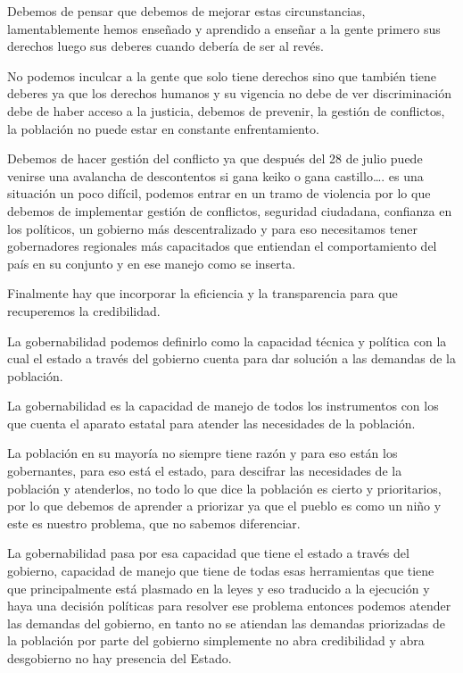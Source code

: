 \documentclass[
  letterpaper,
  DIV=11,
  numbers=noendperiod]{scrartcl}
\begin{document}
Debemos de pensar que debemos de mejorar estas circunstancias,
lamentablemente hemos enseñado y aprendido a enseñar a la gente primero
sus derechos luego sus deberes cuando debería de ser al revés.

No podemos inculcar a la gente que solo tiene derechos sino que también
tiene deberes ya que los derechos humanos y su vigencia no debe de ver
discriminación debe de haber acceso a la justicia, debemos de prevenir,
la gestión de conflictos, la población no puede estar en constante
enfrentamiento.

Debemos de hacer gestión del conflicto ya que después del 28 de julio
puede venirse una avalancha de descontentos si gana keiko o gana
castillo\ldots. es una situación un poco difícil, podemos entrar en un
tramo de violencia por lo que debemos de implementar gestión de
conflictos, seguridad ciudadana, confianza en los políticos, un gobierno
más descentralizado y para eso necesitamos tener gobernadores regionales
más capacitados que entiendan el comportamiento del país en su conjunto
y en ese manejo como se inserta.

Finalmente hay que incorporar la eficiencia y la transparencia para que
recuperemos la credibilidad.

La gobernabilidad podemos definirlo como la capacidad técnica y política
con la cual el estado a través del gobierno cuenta para dar solución a
las demandas de la población.

La gobernabilidad es la capacidad de manejo de todos los instrumentos
con los que cuenta el aparato estatal para atender las necesidades de la
población.

La población en su mayoría no siempre tiene razón y para eso están los
gobernantes, para eso está el estado, para descifrar las necesidades de
la población y atenderlos, no todo lo que dice la población es cierto y
prioritarios, por lo que debemos de aprender a priorizar ya que el
pueblo es como un niño y este es nuestro problema, que no sabemos
diferenciar.

La gobernabilidad pasa por esa capacidad que tiene el estado a través
del gobierno, capacidad de manejo que tiene de todas esas herramientas
que tiene que principalmente está plasmado en la leyes y eso traducido a
la ejecución y haya una decisión políticas para resolver ese problema
entonces podemos atender las demandas del gobierno, en tanto no se
atiendan las demandas priorizadas de la población por parte del gobierno
simplemente no abra credibilidad y abra desgobierno no hay presencia del
Estado.
\end{document}
